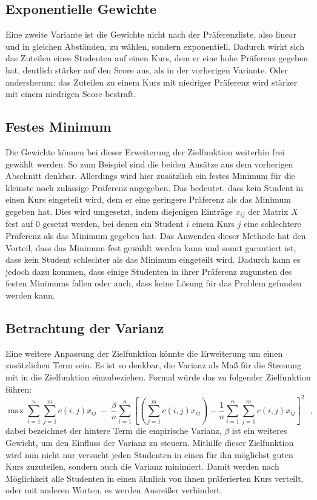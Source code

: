         \subsection{Exponentielle Gewichte}
            Eine zweite Variante ist die Gewichte nicht nach der Präferenzliste, also linear und in gleichen Abständen, zu wählen, sondern exponentiell.
            Dadurch wirkt sich das Zuteilen eines Studenten auf einen Kurs, dem er eine hohe Präferenz gegeben hat, deutlich stärker auf den Score aus, als in der vorherigen Variante.
            Oder andersherum: das Zuteilen zu einem Kurs mit niedriger Präferenz wird stärker mit einem niedrigen Score bestraft.
            
        
        \subsection{Festes Minimum}
            Die Gewichte können bei dieser Erweiterung der Zielfunktion weiterhin frei gewählt werden. 
            So zum Beispiel sind die beiden Ansätze aus dem vorherigen Abschnitt denkbar.
            Allerdings wird hier zusätzlich ein festes Minimum für die kleinste noch zulässige Präferenz angegeben.
            Das bedeutet, dass kein Student in einen Kurs eingeteilt wird, dem er eine geringere Präferenz als das Minimum gegeben hat.
            Dies wird umgesetzt, indem diejenigen Einträge $ x_{ij} $ der Matrix $ X $ fest auf $ 0 $ gesetzt werden, bei denen ein Student $ i $ einem Kurs $ j $ eine schlechtere Präferenz als das Minimum gegeben hat.
            Das Anwenden dieser Methode hat den Vorteil, dass das Minimum fest gewählt werden kann und somit garantiert ist, dass kein Student schlechter als das Minimum eingeteilt wird.
            Dadurch kann es jedoch dazu kommen, dass einige Studenten in ihrer Präferenz zugunsten des festen Minimums fallen oder auch, dass keine Lösung für das Problem gefunden werden kann.
        
        \subsection{Betrachtung der Varianz}
            Eine weitere Anpassung der Zielfunktion könnte die Erweiterung um einen zusätzlichen Term sein.
            Es ist so denkbar, die Varianz als Maß für die Streuung mit in die Zielfunktion einzubeziehen.
            Formal würde das zu folgender Zielfunktion führen:
                $$ \max \sum_{i=1}^{n} \sum_{j=1}^{m} c(i,j)x_{ij} 
                                ~-~ \frac{\beta}{n} \sum_{i=1}^{n}
                                    \left[\left(\sum_{j=1}^{m} c(i,j)x_{ij}\right) - \frac{1}{n} \sum_{i=1}^{n} \sum_{j=1}^{m} c(i,j)x_{ij}\right]^2 ~~~,$$
            dabei bezeichnet der hintere Term die empirische Varianz, $ \beta $ ist ein weiteres Gewicht, um den Einfluss der Varianz zu steuern.
            Mithilfe dieser Zielfunktion wird nun nicht nur versucht jeden Studenten in einen für ihn möglichst guten Kurs zuzuteilen, sondern auch die Varianz minimiert.
            Damit werden nach Möglichkeit alle Studenten in einen ähnlich von ihnen präferierten Kurs verteilt, oder mit anderen Worten, es werden Ausreißer verhindert.\\
            

